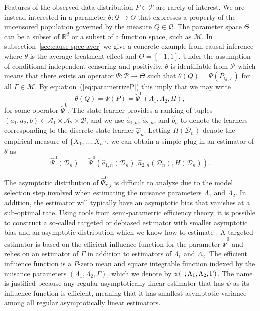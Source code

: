 \documentclass{statsoc}
\newcommand{\R}{\mathbb{R}}
\newcommand{\blank}{\makebox[1ex]{\textbf{$\cdot$}}}
\renewcommand{\phi}{\varphi}
\newcommand{\1}{\mathds{1}}
\newcommand{\data}{\ensuremath{\mathcal{D}}}
\begin{document}
Features of the observed data distribution \( P \in \mathcal{P} \) are rarely of
interest. We are instead interested in a parameter
\( \theta \colon \mathcal{Q} \rightarrow \Theta \) that expresses a property of
the uncensored population governed by the measure \( Q \in \mathcal{Q} \). The
parameter space $\Theta$ can be a subset of \(\R^d\) or a subset of a function
space, such as \(\mathcal{M}\). In subsection~\ref{sec:cause-spec-aver} we give
a concrete example from causal inference where $\theta$ is the average treatment
effect and \( \Theta = [-1,1] \). Under the assumption of conditional
independent censoring and positivity, $\theta$ is identifiable from
\( \mathcal{P} \) which means that there exists an operator
\( \Psi \colon \mathcal{P} \rightarrow \Theta \) such that
\( \theta(Q) = \Psi(P_{Q, \Gamma}) \) for all $\Gamma \in \mathcal{M}$. By
equation~(\ref{eq:parametrizeP}) this imply that we may write
\begin{equation*}
  \theta(Q) = \Psi(P) = \tilde{\Psi}^0(\Lambda_1, \Lambda_2, H),
\end{equation*}
for some operator \( \tilde{\Psi}^0 \). The state learner provides a ranking of
tuples
\( (a_1, a_2, b) \in \mathcal{A}_1 \times \mathcal{A}_2 \times \mathcal{B} \),
and we use \( \hat{a}_{1,n} \), \( \hat{a}_{2,n} \), and \( \hat{b}_n \) to
denote the learners corresponding to the discrete state learner
\( \hat{\phi}_n \). Letting \( H(\data_n) \) denote the empirical measure of
\( \{X_1, \dots, X_n\} \), we can obtain a simple plug-in an estimator of
$\theta$ as
\begin{equation}
  \label{eq:2}
  \hat{\Psi}^0(\data_n) =
  \tilde{\Psi}^0(\hat{a}_{1,n}(\data_n), \hat{a}_{2,n}(\data_n), H(\data_n)). 
\end{equation}

The asymptotic distribution of \( \hat{\Psi}_{\tau, j}^0 \) is difficult to
analyze due to the model selection step involved when estimating the nuisance
parameters $\Lambda_1$ and $\Lambda_2$. In addition, the estimator will
typically have an asymptotic bias that vanishes at a sub-optimal rate. Using
tools from semi-parametric efficiency theory, it is possible to construct a
so-called targeted or debiased estimator with smaller asymptotic bias and an
asymptotic distribution which we know how to estimate
\citep{bickel1993efficient,van2011targeted,chernozhukov2018double}. A targeted
estimator is based on the efficient influence function for the parameter
$\tilde{\Psi}^0$ and relies on an estimator of $\Gamma$ in addition to
estimators of \( \Lambda_1 \) and $\Lambda_2$. The efficient influence function
is a \( P \)-zero mean and square integrable function indexed by the nuisance
parameters \( (\Lambda_1, \Lambda_2, \Gamma) \), which we denote by
\( \psi(\blank ; \Lambda_1, \Lambda_2, \Gamma) \). The name is justified because
any regular asymptotically linear estimator that has \( \psi \) as its influence
function is efficient, meaning that it has smallest asymptotic variance among
all regular asymptotically linear estimators.
\end{document}
